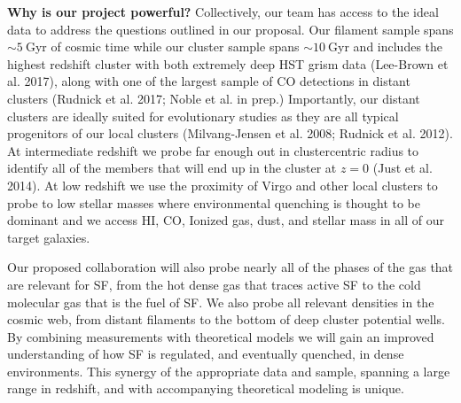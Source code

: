 \documentclass[11pt]{article}
\begin{document}

\textbf{Why is our project powerful?}   Collectively, our team has
access to the ideal data to address the questions outlined in our
proposal.  Our filament sample spans $\sim 5~$Gyr of cosmic time while our cluster sample spans $\sim10~$Gyr and
includes the highest redshift cluster with both extremely deep HST
grism data (Lee-Brown et al. 2017), along with one of the largest sample of CO detections in distant clusters (Rudnick et al. 2017; Noble et al. in prep.)  Importantly, our distant clusters are ideally
suited for evolutionary studies as they are all typical progenitors of
our local clusters (Milvang-Jensen et al. 2008; Rudnick et al. 2012).
At intermediate redshift we probe far enough out in clustercentric
radius to identify all of the members that will end up in the cluster
at $z=0$ (Just et al. 2014).  At low redshift we use the proximity of Virgo and other local clusters to probe to low stellar masses where environmental quenching is thought to be dominant and we access HI, CO, Ionized gas, dust, and stellar mass in all of our target galaxies. 

Our proposed collaboration will also probe nearly all of the phases of
the gas that are relevant for SF, from the hot dense gas
that traces active SF to the cold molecular gas that is
the fuel of SF.  We also probe all relevant densities in the cosmic web, from distant filaments to the bottom of deep cluster potential wells.  By combining  measurements with
theoretical models we will gain an improved understanding of
how SF is regulated, and eventually quenched, in dense
environments.  This synergy of the appropriate data and sample, spanning a large range in redshift, and with
accompanying theoretical modeling is unique.
\end{document}
